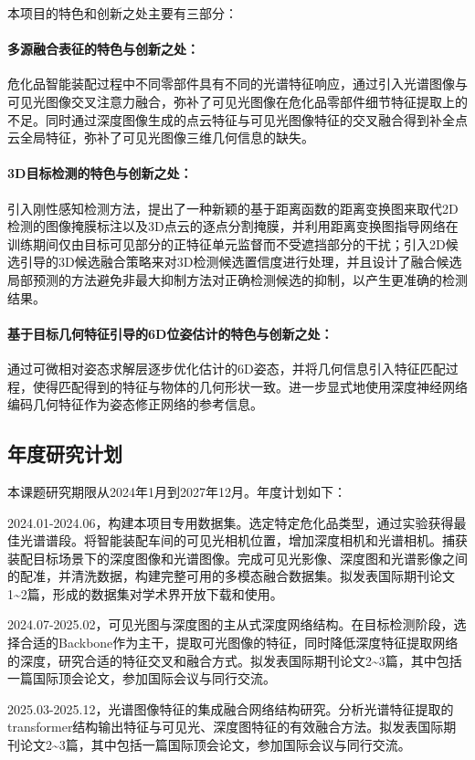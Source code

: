 \documentclass[12pt]{article}
\newcommand{\myPara}[1]{\paragraph{#1：}}
\begin{document}

本项目的特色和创新之处主要有三部分：
\myPara{多源融合表征的特色与创新之处}
危化品智能装配过程中不同零部件具有不同的光谱特征响应，通过引入光谱图像与可见光图像交叉注意力融合，弥补了可见光图像在危化品零部件细节特征提取上的不足。同时通过深度图像生成的点云特征与可见光图像特征的交叉融合得到补全点云全局特征，弥补了可见光图像三维几何信息的缺失。

\myPara{3D目标检测的特色与创新之处}
引入刚性感知检测方法，提出了一种新颖的基于距离函数的距离变换图来取代2D检测的图像掩膜标注以及3D点云的逐点分割掩膜，并利用距离变换图指导网络在训练期间仅由目标可见部分的正特征单元监督而不受遮挡部分的干扰；引入2D候选引导的3D候选融合策略来对3D检测候选置信度进行处理，并且设计了融合候选局部预测的方法避免非最大抑制方法对正确检测候选的抑制，以产生更准确的检测结果。

\myPara{基于目标几何特征引导的6D位姿估计的特色与创新之处}
通过可微相对姿态求解层逐步优化估计的6D姿态，并将几何信息引入特征匹配过程，使得匹配得到的特征与物体的几何形状一致。进一步显式地使用深度神经网络编码几何特征作为姿态修正网络的参考信息。


\subsection{年度研究计划}

本课题研究期限从2024年1月到2027年12月。年度计划如下：  

2024.01-2024.06，构建本项目专用数据集。选定特定危化品类型，通过实验获得最佳光谱谱段。将智能装配车间的可见光相机位置，增加深度相机和光谱相机。捕获装配目标场景下的深度图像和光谱图像。完成可见光影像、深度图和光谱影像之间的配准，并清洗数据，构建完整可用的多模态融合数据集。拟发表国际期刊论文1\textasciitilde2篇，形成的数据集对学术界开放下载和使用。

2024.07-2025.02，可见光图与深度图的主从式深度网络结构。在目标检测阶段，选择合适的Backbone作为主干，提取可光图像的特征，同时降低深度特征提取网络的深度，研究合适的特征交叉和融合方式。拟发表国际期刊论文2\textasciitilde3篇，其中包括一篇国际顶会论文，参加国际会议与同行交流。

2025.03-2025.12，光谱图像特征的集成融合网络结构研究。分析光谱特征提取的transformer结构输出特征与可见光、深度图特征的有效融合方法。拟发表国际期刊论文2\textasciitilde3篇，其中包括一篇国际顶会论文，参加国际会议与同行交流。
\end{document}
